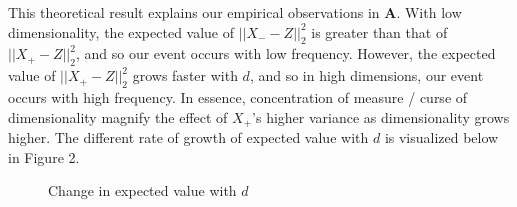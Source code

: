 \documentclass{article}
\begin{document}
\medskip

This theoretical result explains our empirical observations in \textbf{A}. With
low dimensionality, the expected value of $||X_{-} - Z||_2^2$ is greater than
that of $||X_+ -Z||^2_2$, and so our event occurs with low frequency.
However, the expected value of $||X_+ -Z||^2_2$ grows faster with $d$, and so in
high dimensions, our event occurs with high frequency. In essence,
concentration of measure / curse of
dimensionality magnify the effect of $X_+$'s higher variance as dimensionality
grows higher. The different rate of
growth of expected value with $d$ is visualized below in Figure 2.

\begin{figure}[h!]
	\centering
	\caption{Change in expected value with $d$}
\end{figure}
\end{document}
